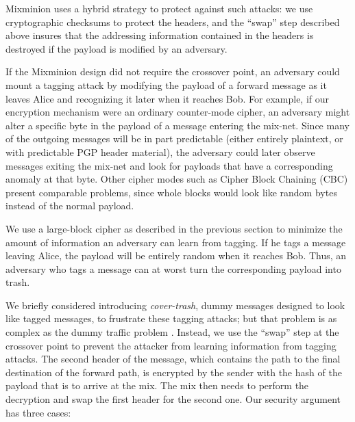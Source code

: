 \documentclass[11pt]{IEEEtran}
\begin{document}
Mixminion uses a hybrid strategy to protect against such attacks: we use
cryptographic checksums to protect the headers, and the ``swap'' step
described above insures that the addressing information contained in the
headers is destroyed if the payload is modified by an adversary.

If the Mixminion design did not require
the crossover point, an adversary could mount a tagging
attack by modifying the payload of a forward message as
it leaves Alice and recognizing it later when it reaches Bob.
For example, if our encryption mechanism were an ordinary
counter-mode cipher, an adversary might alter a specific byte in the payload of
a message entering the mix-net. Since many of the outgoing messages
will be in part predictable (either entirely plaintext, or with
predictable PGP header material), the adversary could later observe
messages exiting the mix-net and look for payloads that have a
corresponding anomaly at that byte. Other cipher modes such as
Cipher Block Chaining (CBC) present comparable problems, since whole
blocks would look like random bytes instead of the normal payload.

We use a large-block cipher as described in the previous section to
minimize the amount of information an adversary can learn from tagging.
If he tags a message
leaving Alice, the payload will be entirely random when it reaches
Bob.  Thus, an adversary who tags a message can at worst turn the
corresponding payload into trash.


We briefly considered introducing \emph{cover-trash}, dummy messages
designed to look like tagged messages, to frustrate
these tagging attacks; but that problem is as complex as the dummy
traffic problem \cite{langos02}. Instead, we use the
``swap'' step at the
crossover point to prevent the attacker from learning information from
tagging attacks. The second header of the message, which contains the
path to the final destination of the forward path, is encrypted by the
sender with the hash of the payload that is to arrive at the mix. The
mix then needs to perform the decryption and swap the first header for
the second one.
Our security argument has three cases:
\end{document}
